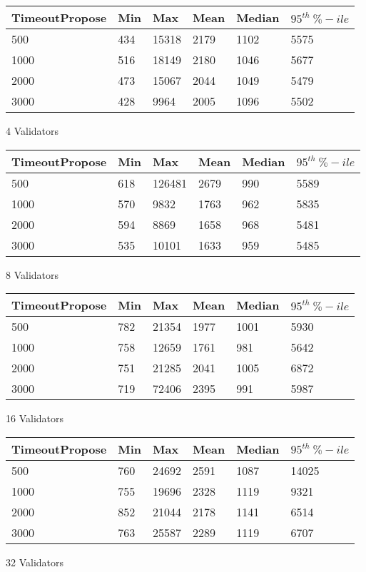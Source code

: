 
\begin{subtable}{.5 \linewidth}
	\centering
	\begin{tabular}{| l | l | l | l | l | l | }
		\hline
		TimeoutPropose & Min & Max & Mean & Median & $95^{th} \ \%-ile$ \\ \hline
		500 & 434 & 15318 & 2179 & 1102 & 5575 \\ \hline
		1000 & 516 & 18149 & 2180 & 1046 & 5677 \\ \hline
		2000 & 473 & 15067 & 2044 & 1049 & 5479 \\ \hline
		3000 & 428 & 9964 & 2005 & 1096 & 5502 \\ \hline
	\end{tabular}
	\caption{4 Validators}
\end{subtable}


\begin{subtable}{.5 \linewidth}
	\centering
	\begin{tabular}{| l | l | l | l | l | l | }
		\hline
		TimeoutPropose & Min & Max & Mean & Median & $95^{th} \ \%-ile$ \\ \hline
		500 & 618 & 126481 & 2679 & 990 & 5589 \\ \hline
		1000 & 570 & 9832 & 1763 & 962 & 5835 \\ \hline
		2000 & 594 & 8869 & 1658 & 968 & 5481 \\ \hline
		3000 & 535 & 10101 & 1633 & 959 & 5485 \\ \hline
	\end{tabular}
	\caption{8 Validators}
\end{subtable}


\begin{subtable}{.5 \linewidth}
	\centering
	\begin{tabular}{| l | l | l | l | l | l | }
		\hline
		TimeoutPropose & Min & Max & Mean & Median & $95^{th} \ \%-ile$ \\ \hline
		500 & 782 & 21354 & 1977 & 1001 & 5930 \\ \hline
		1000 & 758 & 12659 & 1761 & 981 & 5642 \\ \hline
		2000 & 751 & 21285 & 2041 & 1005 & 6872 \\ \hline
		3000 & 719 & 72406 & 2395 & 991 & 5987 \\ \hline
	\end{tabular}
	\caption{16 Validators}
\end{subtable}


\begin{subtable}{.5 \linewidth}
	\centering
	\begin{tabular}{| l | l | l | l | l | l | }
		\hline
		TimeoutPropose & Min & Max & Mean & Median & $95^{th} \ \%-ile$ \\ \hline
		500 & 760 & 24692 & 2591 & 1087 & 14025 \\ \hline
		1000 & 755 & 19696 & 2328 & 1119 & 9321 \\ \hline
		2000 & 852 & 21044 & 2178 & 1141 & 6514 \\ \hline
		3000 & 763 & 25587 & 2289 & 1119 & 6707 \\ \hline
	\end{tabular}
	\caption{32 Validators}
\end{subtable}

